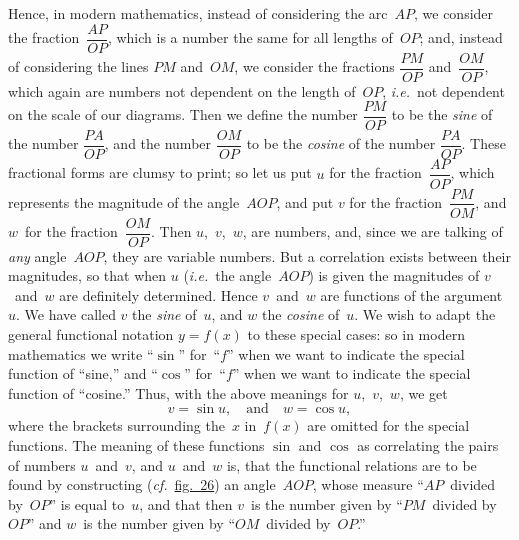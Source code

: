 \documentclass[12pt,leqno]{book}[2005/09/16]
\newcommand{\Chg}[2]{#2}
\newcommand{\Fig}[2][Fig.]{\hyperref[fig:#2]{#1~#2}}
\newcommand{\PageSep}[1]{\ignorespaces}
\newcommand{\cf}{\emph{cf.}}
\newcommand{\ie}{\emph{i.e.}}
\begin{document}
Hence, in modern mathematics, instead
of considering the arc~$AP$, we consider
the fraction~$\dfrac{AP}{OP}$, which is a number the
same for all lengths of~$OP$; and, instead of
considering the lines $PM$ and~$OM$, we consider
\PageSep{183}
the fractions $\dfrac{PM}{OP}$ and~$\dfrac{OM}{OP}$, which again
are numbers not dependent on the length of~$OP$,
\ie~not dependent on the scale of our
diagrams. Then we define the number $\dfrac{PM}{OP}$
to be the \emph{sine} of the number $\dfrac{PA}{OP}$, and the
number $\dfrac{OM}{OP}$ to be the \emph{cosine} of the number
$\dfrac{PA}{OP}$. These fractional forms are clumsy to
print; so let us put $u$ for the fraction~$\dfrac{AP}{OP}$,
which represents the magnitude of the angle~$AOP$,
and put $v$ for the fraction~$\dfrac{PM}{OM}$, and $w$~for
the fraction~$\dfrac{OM}{OP}$. Then $u$,~$v$,~$w$, are numbers,
and, since we are talking of \emph{any} angle~$AOP$,
they are variable numbers. But a
correlation exists between their magnitudes,
so that when $u$ (\ie\ the angle~$AOP$) is given
the magnitudes of $v$~and~$w$ are definitely determined.
Hence $v$~and~$w$ are functions of the
argument~$u$. We have called $v$ the \emph{sine} of~$u$,
and $w$ the \emph{cosine} of~$u$. We wish to adapt
the general functional notation $y = f(x)$ to
these special cases: so in modern mathematics
we write \Chg{$\sin$}{``$\sin$''} for~``$f$'' when we want to
\PageSep{184}
indicate the special function of ``sine,'' and
``$\cos$'' for~``$f$'' when we want to indicate
the special function of ``cosine.'' Thus, with
the above meanings for $u$,~$v$,~$w$, we get
\[
v = \sin u,\quad\text{and}\quad
w = \cos u,
\]
where the brackets surrounding the~$x$ in~$f(x)$
are omitted for the special functions. The
meaning of these functions $\sin$ and $\cos$ as
correlating the pairs of numbers $u$~and~$v$, and
$u$~and~$w$ is, that the functional relations are to
be found by constructing (\cf\ \Fig[fig.]{26}) an angle~$AOP$,
whose measure ``$AP$~divided by~$OP$''
is equal to~$u$, and that then $v$~is the number
given by ``$PM$~divided by~$OP$'' and $w$~is the
number given by ``$OM$~divided by~$OP$.''
\end{document}
